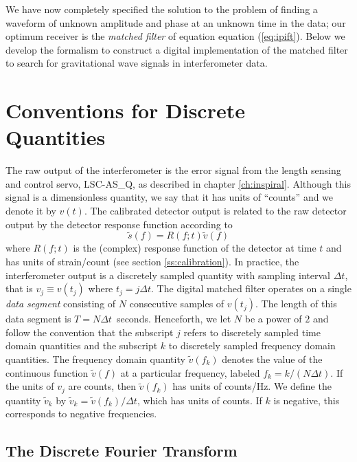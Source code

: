 We have now completely specified the solution to the problem of finding a
waveform of unknown amplitude and phase at an unknown time in the data;
our optimum receiver is the \emph{matched filter} of equation equation
(\ref{eq:ipift}). Below we develop the formalism to construct a digital
implementation of the matched filter to search for gravitational wave signals
in interferometer data.

\section{Conventions for Discrete Quantities}
\label{s:conventions}

The raw output of the interferometer is the error signal from the length
sensing and control servo, LSC-AS\_Q, as described in chapter
\ref{ch:inspiral}.  Although this signal is a dimensionless quantity, we say
that it has units of ``counts'' and we denote it by $v(t)$.  The calibrated
detector output is related to the raw detector output by the detector response
function according
to \begin{equation}
\tilde{s}(f) = R(f;t) \tilde{v}(f)
\end{equation}
where $R(f;t)$ is the (complex) response function of the detector at time $t$
and has units of strain/count (see section \ref{ss:calibration}).  In
practice, the interferometer output is a discretely sampled quantity with
sampling interval $\Delta t$, that is $v_j \equiv v(t_j)$ where $t_j = j\Delta
t$.  The digital matched filter operates on a single \emph{data segment}
consisting of $N$ consecutive samples of $v(t_j)$. The length of this data
segment is $T = N\Delta t$~seconds.  Henceforth, we let $N$ be a power of
$2$ and follow the convention that the subscript $j$ refers to discretely
sampled time domain quantities and the subscript $k$ to discretely sampled
frequency domain quantities.  The frequency domain quantity $\tilde{v}(f_k)$
denotes the value of the continuous function $\tilde{v}(f)$ at a particular
frequency, labeled $f_k = k/(N\Delta t)$. If the units of $v_j$ are counts,
then $\tilde{v}(f_k)$ has units of counts/Hz. We define the quantity
$\tilde{v}_k$ by $\tilde{v}_k = \tilde{v}(f_k) / \Delta t$, which has units of
counts. If $k$ is negative, this corresponds to negative frequencies.

\subsection{The Discrete Fourier Transform}
\label{ss:dft}

